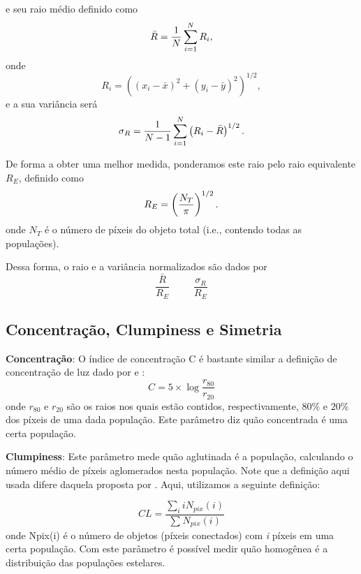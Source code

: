 e seu raio médio definido como
\begin{equation}
{\bar R} = {1 \over N} \sum_{i=1}^N R_i ,  
\end{equation}
onde
\begin{equation}
 R_i = \left( (x_i-{\bar x})^2 + (y_i-{\bar y})^2 \right)^{1/2} ,
\end{equation}
e a sua variância será
\[ \sigma_R = {1 \over N-1} \sum_{i=1}^N \left(R_i-{\bar R}  \right)^{1/2}. \] 


De forma a obter uma melhor medida, ponderamos este raio pelo raio equivalente $R_E$, definido como 
\begin{equation}
 R_E = \left({N_T \over \pi}\right)^{1/2}.  
\end{equation}
onde $N_T$ é o número de píxeis do objeto total (i.e., contendo todas as populações).

Dessa forma, o raio e a variância normalizados são dados por
\begin{equation}
\frac{\bar R}{R_{E}}~~~~~~~~~~~
\frac{\sigma_{R}}{R_{E}}
\end{equation}


\subsection{Concentração, Clumpiness e Simetria}

\textbf{Concentração}: O índice de concentração C é bastante similar a definição de concentração de luz dado por \citet{bershady} e \citet{conselice2014}:
\begin{equation}
C = 5\times\log{\frac{r_{80}}{r_{20}}} 
\end{equation}
\noindent
onde $r_{80}$ e $r_{20}$ são os raios nos quais estão contidos, respectivamente, $80\%$ e $20\%$ dos píxeis de uma dada população. Este parâmetro diz quão concentrada é uma certa população.

\textbf{Clumpiness}: Este parâmetro mede quão aglutinada é a população, calculando o número médio de píxeis aglomerados nesta população. Note que a definição aqui usada difere daquela proposta por \citet{conselice2003,conselice2014}. Aqui, utilizamos a seguinte definição:

\begin{equation}
CL = \frac{\sum_{i}^{} iN_{pix}(i)}{\sum_{}^{} N_{pix}(i)}
\end{equation}
onde Npix(i) é o número de objetos (píxeis conectados) com \textit{i} píxeis em uma certa população. Com este parâmetro é possível medir quão homogênea é a distribuição das populações estelares.

